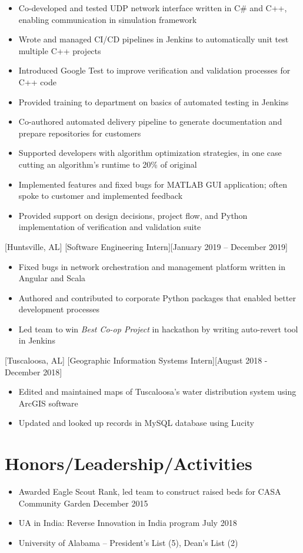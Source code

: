 \documentclass[hidelinks, 11pt]{article}
\begin{document}
\begin{itemize}
	\item Co-developed and tested UDP network interface written in C\# and C++, enabling communication in simulation framework
	\item Wrote and managed CI/CD pipelines in Jenkins to automatically unit test multiple C++ projects
	\item Introduced Google Test to improve verification and validation processes for C++ code
	\item Provided training to department on basics of automated testing in Jenkins
	\item Co-authored automated delivery pipeline to generate documentation and prepare repositories for customers
	\item Supported developers with algorithm optimization strategies, in one case cutting an algorithm's runtime to 20\% of original
	\item Implemented features and fixed bugs for MATLAB GUI application; often spoke to customer and implemented feedback
	\item Provided support on design decisions, project flow, and Python implementation of verification and validation suite
\end{itemize}

[Huntsville, AL]
[Software Engineering Intern][January 2019 -- December 2019]

\begin{itemize}
	\item Fixed bugs in network orchestration and management platform written in Angular and Scala
	\item Authored and contributed to corporate Python packages that enabled better development processes
	\item Led team to win \textit{Best Co-op Project} in hackathon by writing auto-revert tool in Jenkins
\end{itemize}

[Tuscaloosa, AL]
[Geographic Information Systems Intern][August 2018 - December 2018]

\begin{itemize}
	\item Edited and maintained maps of Tuscaloosa’s water distribution system using ArcGIS software
	\item Updated and looked up records in MySQL database using Lucity
\end{itemize}

\section{Honors/Leadership/Activities}

\begin{itemize}
	\item Awarded Eagle Scout Rank, led team to construct raised beds for CASA Community Garden \hfill December 2015
	\item UA in India: Reverse Innovation in India program \hfill July 2018
	\item University of Alabama -- President's List (5), Dean's List (2)
\end{itemize}
\end{document}
